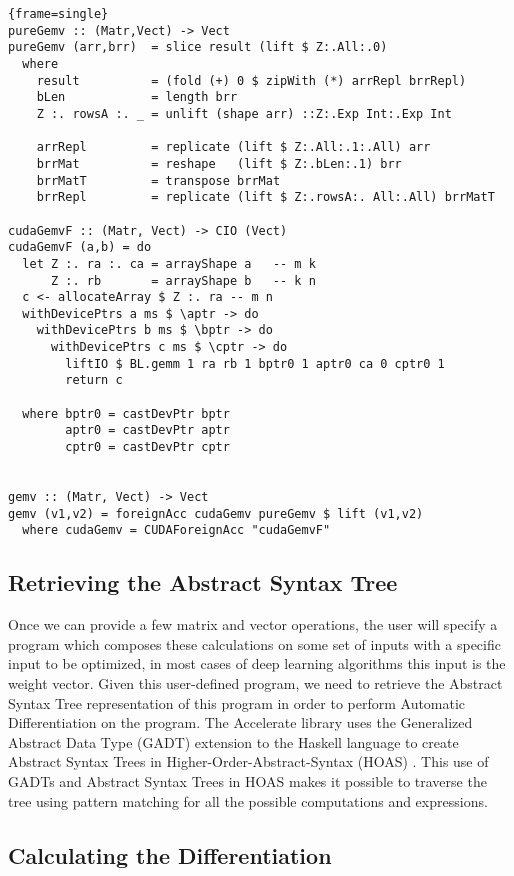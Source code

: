 \documentclass[prodmode,acmtecs]{acmsmall} %
\begin{document}
\smallskip
\lstset{language=Haskell}
\begin{lstlisting}{frame=single}
pureGemv :: (Matr,Vect) -> Vect
pureGemv (arr,brr)  = slice result (lift $ Z:.All:.0)
  where
    result          = (fold (+) 0 $ zipWith (*) arrRepl brrRepl)
    bLen            = length brr
    Z :. rowsA :. _ = unlift (shape arr) ::Z:.Exp Int:.Exp Int

    arrRepl         = replicate (lift $ Z:.All:.1:.All) arr
    brrMat          = reshape   (lift $ Z:.bLen:.1) brr
    brrMatT         = transpose brrMat
    brrRepl         = replicate (lift $ Z:.rowsA:. All:.All) brrMatT

cudaGemvF :: (Matr, Vect) -> CIO (Vect)
cudaGemvF (a,b) = do
  let Z :. ra :. ca = arrayShape a   -- m k
      Z :. rb       = arrayShape b   -- k n
  c <- allocateArray $ Z :. ra -- m n
  withDevicePtrs a ms $ \aptr -> do
    withDevicePtrs b ms $ \bptr -> do
      withDevicePtrs c ms $ \cptr -> do
        liftIO $ BL.gemm 1 ra rb 1 bptr0 1 aptr0 ca 0 cptr0 1
        return c
        
  where bptr0 = castDevPtr bptr
 	 	aptr0 = castDevPtr aptr
 	 	cptr0 = castDevPtr cptr
 	 	

gemv :: (Matr, Vect) -> Vect
gemv (v1,v2) = foreignAcc cudaGemv pureGemv $ lift (v1,v2)
  where cudaGemv = CUDAForeignAcc "cudaGemvF"
\end{lstlisting}
\smallskip

\subsection{Retrieving the Abstract Syntax Tree}

Once we can provide a few matrix and vector operations, the user will specify a program
which composes these calculations on some set of inputs with a specific input to be
optimized, in most cases of deep learning algorithms this input is the weight vector.
Given this user-defined program, we need to retrieve the Abstract Syntax Tree representation
of this program in order to perform Automatic Differentiation on the program. The Accelerate
library uses the Generalized Abstract Data Type (GADT) extension to the Haskell language
to create Abstract Syntax Trees in Higher-Order-Abstract-Syntax (HOAS)
\cite{chakravarty2011}. This use of GADTs and Abstract Syntax Trees in HOAS makes it possible
to traverse the tree using pattern matching for all the possible computations and
expressions.

\subsection{Calculating the Differentiation}
\end{document}

